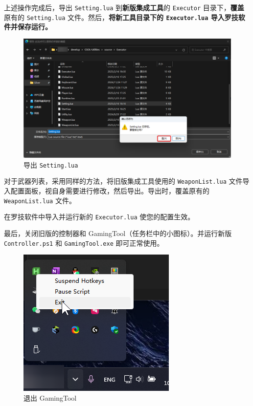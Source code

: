 上述操作完成后，导出 \lstinline{Setting.lua} 到\textbf{\color{red}新版集成工具}的 \lstinline{Executor} 目录下，\textbf{\color{red}覆盖}原有的 \lstinline{Setting.lua} 文件。然后，\textbf{\color{red}将新工具目录下的 \lstinline{Executor.lua} 导入罗技软件并保存运行。}

\begin{figure}[H]
    \Centering
    \includegraphics[width=\textwidth]{documents/assets/override_setting}
    \caption{导出 \lstinline{Setting.lua}}
\end{figure}

对于武器列表，采用同样的方法，将旧版集成工具使用的 \lstinline{WeaponList.lua} 文件导入配置面板，视自身需要进行修改，然后导出。导出时，覆盖原有的 \lstinline{WeaponList.lua} 文件。

在罗技软件中导入并运行新的 \lstinline{Executor.lua} 使您的配置生效。

最后，关闭旧版的控制器和 GamingTool（任务栏中的小图标）。并运行新版 \lstinline{Controller.ps1} 和 \lstinline{GamingTool.exe} 即可正常使用。

\begin{figure}[H]
    \Centering
    \includegraphics[width=\textwidth]{documents/assets/intro/exit_gamingtool}
    \caption{退出 GamingTool}
\end{figure}